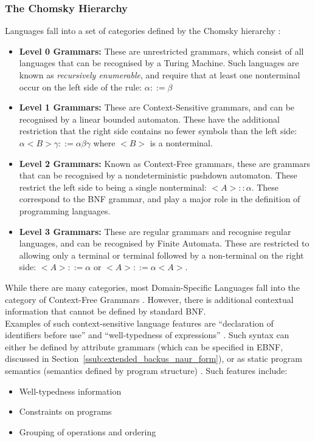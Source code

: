\subsubsection{The Chomsky Hierarchy} %
\label{ssub:the_chomsky_hierarchy}
Languages fall into a set of categories defined by the Chomsky hierarchy \citep{slonneger1995formal}:
\begin{itemize}
    \item \textbf{Level 0 Grammars:} These are unrestricted grammars, which consist of all languages that can be recognised by a Turing Machine.
    Such languages are known as \textit{recursively enumerable}, and require that at least one nonterminal occur on the left side of the rule: $\alpha ::= \beta$
    \item \textbf{Level 1 Grammars:} These are Context-Sensitive grammars, and can be recognised by a linear bounded automaton. 
    These have the additional restriction that the right side contains no fewer symbols than the left side: $\alpha<B>\gamma ::= \alpha\beta\gamma$ where $<B>$ is a nonterminal.
    \item \textbf{Level 2 Grammars:} Known as Context-Free grammars, these are grammars that can be recognised by a nondeterministic pushdown automaton.
    These restrict the left side to being a single nonterminal: $<A> :: \alpha$.
    These correspond to the BNF grammar, and play a major role in the definition of programming languages. 
    \item \textbf{Level 3 Grammars:} These are regular grammars and recognise regular languages, and can be recognised by Finite Automata. 
    These are restricted to allowing only a terminal or terminal followed by a non-terminal on the right side: $<A> ::= \alpha$ or $<A> ::= \alpha<A>$.
\end{itemize}

While there are many categories, most Domain-Specific Languages fall into the category of Context-Free Grammars \citep{Siek:2010:GPL:1706356.1706358}.
However, there is additional contextual information that cannot be defined by standard BNF.\\

Examples of such context-sensitive language features are ``declaration of identifiers before use'' and ``well-typedness of expressions'' \citep{mosses1992action}.
Such syntax can either be defined by attribute grammars (which can be specified in EBNF, discussed in Section~\ref{ssub:extended_backus_naur_form}), or as static program semantics (semantics defined by program structure) \citep{mosses1992action}. 
Such features include:
\begin{itemize}
    \item Well-typedness information
    \item Constraints on programs
    \item Grouping of operations and ordering
\end{itemize}

